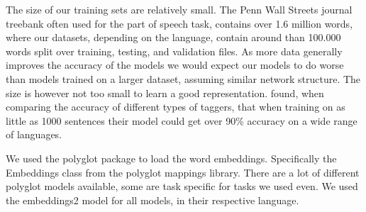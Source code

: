 The size of our training sets are relatively small. The Penn Wall Streets
journal treebank \cite{wsj} often used for the part of speech task, contains
over 1.6 million words, where our datasets, depending on the language, contain
around than 100.000 words split over training, testing, and validation files. As
more data generally improves the accuracy of the models we would expect our
models to do worse than models trained on a larger dataset, assuming similar
network structure. The size is however not too small to learn a good
representation. \cite{plank2016multilingual} found, when comparing the accuracy
of different types of taggers, that when training on as little as 1000 sentences
their model could get over 90\% accuracy on a wide range of languages.

We used the polyglot package to load the word embeddings. Specifically the
Embeddings class from the polyglot mappings library. There are a lot of
different polyglot models available, some are task specific for tasks we used
even. We used the embeddings2 model for all models, in their respective
language. 

\pagebreak
